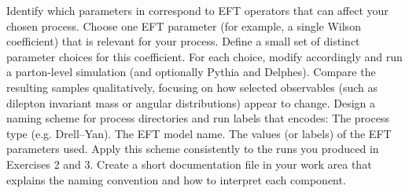 Identify which parameters in  correspond to EFT operators that can affect your chosen process.\markdownRendererOlItemEnd 
\markdownRendererOlEndTight \markdownRendererInterblockSeparator
{}
\markdownRendererSectionEnd \markdownRendererSectionBegin
{}\markdownRendererInterblockSeparator
{}\markdownRendererOlBeginTight
{}Choose one EFT parameter (for example, a single Wilson coefficient) that is relevant for your process.\markdownRendererOlItemEnd 
{}Define a small set of distinct parameter choices for this coefficient.\markdownRendererOlItemEnd 
{}For each choice, modify  accordingly and run a parton-level simulation (and optionally Pythia and Delphes).\markdownRendererOlItemEnd 
{}Compare the resulting samples qualitatively, focusing on how selected observables (such as dilepton invariant mass or angular distributions) appear to change.\markdownRendererOlItemEnd 
\markdownRendererOlEndTight \markdownRendererInterblockSeparator
{}
\markdownRendererSectionEnd \markdownRendererSectionBegin
{}\markdownRendererInterblockSeparator
{}\markdownRendererOlBeginTight
{}Design a naming scheme for process directories and run labels that encodes:\markdownRendererInterblockSeparator
{}\markdownRendererUlBeginTight
\markdownRendererUlItem The process type (e.g. Drell–Yan).\markdownRendererUlItemEnd 
\markdownRendererUlItem The EFT model name.\markdownRendererUlItemEnd 
\markdownRendererUlItem The values (or labels) of the EFT parameters used.\markdownRendererUlItemEnd 
\markdownRendererUlEndTight \markdownRendererOlItemEnd 
{}Apply this scheme consistently to the runs you produced in Exercises 2 and 3.\markdownRendererOlItemEnd 
{}Create a short documentation file in your work area that explains the naming convention and how to interpret each component.\markdownRendererOlItemEnd 
\markdownRendererOlEndTight \markdownRendererInterblockSeparator
{}
\markdownRendererSectionEnd \markdownRendererSectionBegin
{}\markdownRendererInterblockSeparator
